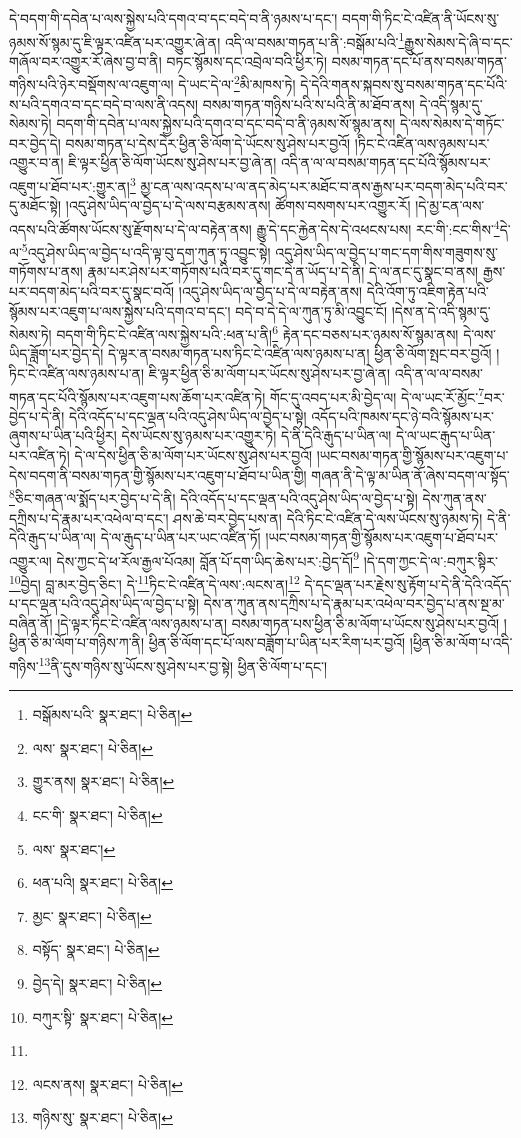 དེ་བདག་གི་དབེན་པ་ལས་སྐྱེས་པའི་དགའ་བ་དང་བདེ་བ་ནི་ཉམས་པ་དང་། བདག་གི་ཏིང་ངེ་འཛིན་ནི་ཡོངས་སུ་ཉམས་སོ་སྙམ་དུ་ཇི་ལྟར་འཛིན་པར་འགྱུར་ཞེ་ན། འདི་ལ་བསམ་གཏན་པ་ནི་:བསྒོམ་པའི་\footnote{བསྒོམས་པའི་  སྣར་ཐང་།  པེ་ཅིན། }རྒྱུས་སེམས་དེ་ཞི་བ་དང་གཞོལ་བར་འགྱུར་རོ་ཞེས་བྱ་བ་ནི། བཏང་སྙོམས་དང་འབྲེལ་བའི་ཕྱིར་ཏེ། བསམ་གཏན་དང་པོ་ནས་བསམ་གཏན་གཉིས་པའི་ཉེར་བསྡོགས་ལ་འཇུག་ལ། དེ་ཡང་དེ་ལ་\footnote{ལས་  སྣར་ཐང་།  པེ་ཅིན། }མི་མཁས་ཏེ། དེ་དེའི་གནས་སྐབས་སུ་བསམ་གཏན་དང་པོའི་ས་པའི་དགའ་བ་དང་བདེ་བ་ལས་ནི་འདས། བསམ་གཏན་གཉིས་པའི་ས་པའི་ནི་མ་ཐོབ་ནས། དེ་འདི་སྙམ་དུ་སེམས་ཏེ། བདག་གི་དབེན་པ་ལས་སྐྱེས་པའི་དགའ་བ་དང་བདེ་བ་ནི་ཉམས་སོ་སྙམ་ནས། དེ་ལས་སེམས་དེ་གཏོང་བར་བྱེད་དེ། བསམ་གཏན་པ་དེས་དེར་ཕྱིན་ཅི་ལོག་དེ་ཡོངས་སུ་ཤེས་པར་བྱའོ། །ཏིང་ངེ་འཛིན་ལས་ཉམས་པར་འགྱུར་བ་ན། ཇི་ལྟར་ཕྱིན་ཅི་ལོག་ཡོངས་སུ་ཤེས་པར་བྱ་ཞེ་ན། འདི་ན་ལ་ལ་བསམ་གཏན་དང་པོའི་སྙོམས་པར་འཇུག་པ་ཐོབ་པར་:གྱུར་ན།\footnote{གྱུར་ནས།  སྣར་ཐང་།  པེ་ཅིན། } མྱ་ངན་ལས་འདས་པ་ལ་ནད་མེད་པར་མཐོང་བ་ནས་རྒྱས་པར་བདག་མེད་པའི་བར་དུ་མཐོང་སྟེ། །འདུ་ཤེས་ཡིད་ལ་བྱེད་པ་དེ་ལས་བརྩམས་ནས། ཚོགས་བསགས་པར་འགྱུར་རོ། །དེ་མྱ་ངན་ལས་འདས་པའི་ཚོགས་ཡོངས་སུ་རྫོགས་པ་དེ་ལ་བརྟེན་ནས། རྒྱུ་དེ་དང་རྐྱེན་དེས་དེ་འཕངས་པས། རང་གི་:ངང་གིས་\footnote{ངང་གི་  སྣར་ཐང་།  པེ་ཅིན། }དེ་ལ་\footnote{ལས་  སྣར་ཐང་། }འདུ་ཤེས་ཡིད་ལ་བྱེད་པ་འདི་ལྟ་བུ་དག་ཀུན་ཏུ་འབྱུང་སྟེ། འདུ་ཤེས་ཡིད་ལ་བྱེད་པ་གང་དག་གིས་གཟུགས་སུ་གཏོགས་པ་ནས། རྣམ་པར་ཤེས་པར་གཏོགས་པའི་བར་དུ་གང་དེ་ན་ཡོད་པ་དེ་ནི། དེ་ལ་ནང་དུ་སྣང་བ་ནས། རྒྱས་པར་བདག་མེད་པའི་བར་དུ་སྣང་བའོ། །འདུ་ཤེས་ཡིད་ལ་བྱེད་པ་དེ་ལ་བརྟེན་ནས། དེའི་འོག་ཏུ་འཇིག་རྟེན་པའི་སྙོམས་པར་འཇུག་པ་ལས་སྐྱེས་པའི་དགའ་བ་དང་། བདེ་བ་དེ་དེ་ལ་ཀུན་ཏུ་མི་འབྱུང་ངོ། །དེས་ན་དེ་འདི་སྙམ་དུ་སེམས་ཏེ། བདག་གི་ཏིང་ངེ་འཛིན་ལས་སྐྱེས་པའི་:ཕན་པ་ནི།\footnote{ཕན་པའི།  སྣར་ཐང་།  པེ་ཅིན། } རྟེན་དང་བཅས་པར་ཉམས་སོ་སྙམ་ནས། དེ་ལས་ཡིད་ཟློག་པར་བྱེད་དེ། དེ་ལྟར་ན་བསམ་གཏན་པས་ཏིང་ངེ་འཛིན་ལས་ཉམས་པ་ན། ཕྱིན་ཅི་ལོག་སྤང་བར་བྱའོ། །ཏིང་ངེ་འཛིན་ལས་ཉམས་པ་ན། ཇི་ལྟར་ཕྱིན་ཅི་མ་ལོག་པར་ཡོངས་སུ་ཤེས་པར་བྱ་ཞེ་ན། འདི་ན་ལ་ལ་བསམ་གཏན་དང་པོའི་སྙོམས་པར་འཇུག་པས་ཆོག་པར་འཛིན་ཏེ། གོང་དུ་འབད་པར་མི་བྱེད་ལ། དེ་ལ་ཡང་རོ་མྱོང་\footnote{མྱང་  སྣར་ཐང་།  པེ་ཅིན། }བར་བྱེད་པ་དེ་ནི། དེའི་འདོད་པ་དང་ལྡན་པའི་འདུ་ཤེས་ཡིད་ལ་བྱེད་པ་སྟེ། འདོད་པའི་ཁམས་དང་ཉེ་བའི་སྙོམས་པར་ཞུགས་པ་ཡིན་པའི་ཕྱིར། དེས་ཡོངས་སུ་ཉམས་པར་འགྱུར་ཏེ། དེ་ནི་དེའི་རྒུད་པ་ཡིན་ལ། དེ་ལ་ཡང་རྒུད་པ་ཡིན་པར་འཛིན་ཏེ། དེ་ལ་དེས་ཕྱིན་ཅི་མ་ལོག་པར་ཡོངས་སུ་ཤེས་པར་བྱའོ། །ཡང་བསམ་གཏན་གྱི་སྙོམས་པར་འཇུག་པ་དེས་བདག་ནི་བསམ་གཏན་གྱི་སྙོམས་པར་འཇུག་པ་ཐོབ་པ་ཡིན་གྱི། གཞན་ནི་དེ་ལྟ་མ་ཡིན་ནོ་ཞེས་བདག་ལ་སྟོད་\footnote{བསྟོད་  སྣར་ཐང་།  པེ་ཅིན། }ཅིང་གཞན་ལ་སྨོད་པར་བྱེད་པ་དེ་ནི། དེའི་འདོད་པ་དང་ལྡན་པའི་འདུ་ཤེས་ཡིད་ལ་བྱེད་པ་སྟེ། དེས་ཀུན་ནས་དཀྲིས་པ་དེ་རྣམ་པར་འཕེལ་བ་དང་། ཤས་ཆེ་བར་བྱེད་པས་ན། དེའི་ཏིང་ངེ་འཛིན་དེ་ལས་ཡོངས་སུ་ཉམས་ཏེ། དེ་ནི་དེའི་རྒུད་པ་ཡིན་ལ། དེ་ལ་རྒུད་པ་ཡིན་པར་ཡང་འཛིན་ཏོ། །ཡང་བསམ་གཏན་གྱི་སྙོམས་པར་འཇུག་པ་ཐོབ་པར་འགྱུར་ལ། དེས་ཀྱང་དེ་ཕ་རོལ་རྒྱལ་པོའམ། བློན་པོ་དག་ཡིད་ཆེས་པར་:བྱེད་དོ།\footnote{བྱེད་དེ།  སྣར་ཐང་།  པེ་ཅིན། } །དེ་དག་ཀྱང་དེ་ལ་:བཀུར་སྟིར་\footnote{བཀུར་སྟི་  སྣར་ཐང་།  པེ་ཅིན། }བྱེད། བླ་མར་བྱེད་ཅིང་། དེ་\footnote{}ཏིང་ངེ་འཛིན་དེ་ལས་:ལངས་ན།\footnote{ལངས་ནས།  སྣར་ཐང་།  པེ་ཅིན། } དེ་དང་ལྡན་པར་རྗེས་སུ་རྟོག་པ་དེ་ནི་དེའི་འདོད་པ་དང་ལྡན་པའི་འདུ་ཤེས་ཡིད་ལ་བྱེད་པ་སྟེ། དེས་ན་ཀུན་ནས་དཀྲིས་པ་དེ་རྣམ་པར་འཕེལ་བར་བྱེད་པ་ནས་སྔ་མ་བཞིན་ནོ། །དེ་ལྟར་ཏིང་ངེ་འཛིན་ལས་ཉམས་པ་ན། བསམ་གཏན་པས་ཕྱིན་ཅི་མ་ལོག་པ་ཡོངས་སུ་ཤེས་པར་བྱའོ། །ཕྱིན་ཅི་མ་ལོག་པ་གཉིས་ཀ་ནི། ཕྱིན་ཅི་ལོག་དང་པོ་ལས་བཟློག་པ་ཡིན་པར་རིག་པར་བྱའོ། །ཕྱིན་ཅི་མ་ལོག་པ་འདི་གཉིས་\footnote{གཉིས་སུ་  སྣར་ཐང་།  པེ་ཅིན། }ནི་དུས་གཉིས་སུ་ཡོངས་སུ་ཤེས་པར་བྱ་སྟེ། ཕྱིན་ཅི་ལོག་པ་དང་། 